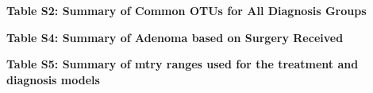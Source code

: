 \documentclass[12pt,]{article}
\begin{document}
\newpage

\newcommand{\blandscape}{\begin{landscape}}
\newcommand{\elandscape}{\end{landscape}}

\textbf{Table S2: Summary of Common OTUs for All Diagnosis Groups}

\footnotesize

\normalsize
\newpage

\textbf{Table S4: Summary of Adenoma based on Surgery Received}

\newpage

\textbf{Table S5: Summary of mtry ranges used for the treatment and
diagnosis models}

\footnotesize

\normalsize
\end{document}
